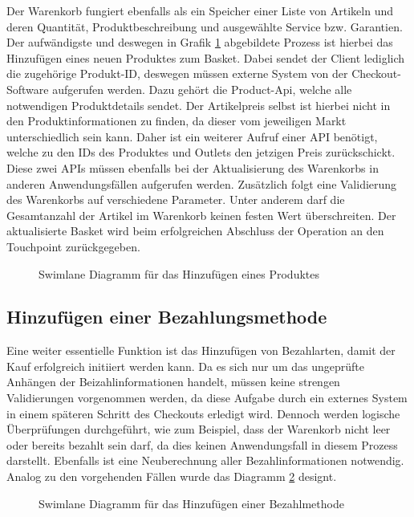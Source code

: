 Der Warenkorb fungiert ebenfalls als ein Speicher einer Liste von Artikeln und deren Quantität, Produktbeschreibung und ausgewählte Service bzw. Garantien. Der aufwändigste und deswegen in Grafik \ref{fig:SL-AddProduct} abgebildete Prozess ist hierbei das Hinzufügen eines neuen Produktes zum Basket. Dabei sendet der Client lediglich die zugehörige Produkt-ID, deswegen müssen externe System von der Checkout-Software aufgerufen werden. Dazu gehört die Product-Api, welche alle notwendigen Produktdetails sendet. Der Artikelpreis selbst ist hierbei nicht in den Produktinformationen zu finden, da dieser vom jeweiligen Markt unterschiedlich sein kann. Daher ist ein weiterer Aufruf einer API benötigt, welche zu den IDs des Produktes und Outlets den jetzigen Preis zurückschickt. Diese zwei APIs müssen ebenfalls bei der Aktualisierung des Warenkorbs in anderen Anwendungsfällen aufgerufen werden. Zusätzlich folgt eine Validierung des Warenkorbs auf verschiedene Parameter. Unter anderem darf die Gesamtanzahl der Artikel im Warenkorb keinen festen Wert überschreiten. Der aktualisierte Basket wird beim erfolgreichen Abschluss der Operation an den Touchpoint zurückgegeben.

\begin{figure}[htbp]
	\centering
	
	\caption{Swimlane Diagramm für das Hinzufügen eines Produktes }
	\label{fig:SL-AddProduct}
\end{figure}

\subsection{Hinzufügen einer Bezahlungsmethode}

Eine weiter essentielle Funktion ist das Hinzufügen von Bezahlarten, damit der Kauf erfolgreich initiiert werden kann.  Da es sich nur um das ungeprüfte Anhängen der Beizahlinformationen handelt, müssen keine strengen Validierungen vorgenommen werden, da diese Aufgabe durch ein externes System in einem späteren Schritt des Checkouts erledigt wird. Dennoch werden logische Überprüfungen durchgeführt, wie zum Beispiel, dass der Warenkorb nicht leer oder bereits bezahlt sein darf, da dies keinen Anwendungsfall in diesem Prozess darstellt. Ebenfalls ist eine Neuberechnung aller Bezahlinformationen notwendig. Analog zu den vorgehenden Fällen wurde das Diagramm \ref{fig:SL-PutBezahlmethode} designt.

\begin{figure}[htbp]
	\centering
	
	\caption{Swimlane Diagramm für das Hinzufügen einer Bezahlmethode}
	\label{fig:SL-PutBezahlmethode}
\end{figure}

